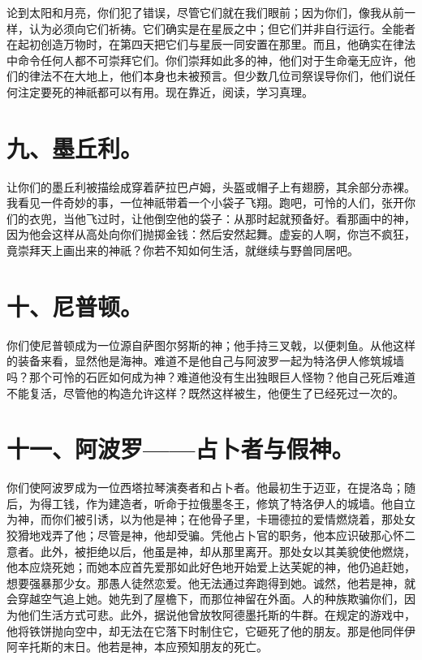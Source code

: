 论到太阳和月亮，你们犯了错误，尽管它们就在我们眼前；因为你们，像我从前一样，认为必须向它们祈祷。它们确实是在星辰之中；但它们并非自行运行。全能者在起初创造万物时，在第四天把它们与星辰一同安置在那里。而且，他确实在律法中命令任何人都不可崇拜它们。你们崇拜如此多的神，他们对于生命毫无应许，他们的律法不在大地上，他们本身也未被预言。但少数几位司祭误导你们，他们说任何注定要死的神祇都可以有用。现在靠近，阅读，学习真理。\par


\section{九、墨丘利。}

让你们的墨丘利被描绘成穿着萨拉巴卢姆，头盔或帽子上有翅膀，其余部分赤裸。我看见一件奇妙的事，一位神祇带着一个小袋子飞翔。跑吧，可怜的人们，张开你们的衣兜，当他飞过时，让他倒空他的袋子：从那时起就预备好。看那画中的神，因为他会这样从高处向你们抛掷金钱：然后安然起舞。虚妄的人啊，你岂不疯狂，竟崇拜天上画出来的神祇？你若不知如何生活，就继续与野兽同居吧。\par


\section{十、尼普顿。}

你们使尼普顿成为一位源自萨图尔努斯的神；他手持三叉戟，以便刺鱼。从他这样的装备来看，显然他是海神。难道不是他自己与阿波罗一起为特洛伊人修筑城墙吗？那个可怜的石匠如何成为神？难道他没有生出独眼巨人怪物？他自己死后难道不能复活，尽管他的构造允许这样？既然这样被生，他便生了已经死过一次的。\par


\section{十一、阿波罗——占卜者与假神。}

你们使阿波罗成为一位西塔拉琴演奏者和占卜者。他最初生于迈亚，在提洛岛；随后，为得工钱，作为建造者，听命于拉俄墨冬王，修筑了特洛伊人的城墙。他自立为神，而你们被引诱，以为他是神；在他骨子里，卡珊德拉的爱情燃烧着，那处女狡猾地戏弄了他；尽管是神，他却受骗。凭他占卜官的职务，他本应识破那心怀二意者。此外，被拒绝以后，他虽是神，却从那里离开。那处女以其美貌使他燃烧，他本应烧死她；而她本应首先爱那如此好色地开始爱上达芙妮的神，他仍追赶她，想要强暴那少女。那愚人徒然恋爱。他无法通过奔跑得到她。诚然，他若是神，就会穿越空气追上她。她先到了屋檐下，而那位神留在外面。人的种族欺骗你们，因为他们生活方式可悲。此外，据说他曾放牧阿德墨托斯的牛群。在规定的游戏中，他将铁饼抛向空中，却无法在它落下时制住它，它砸死了他的朋友。那是他同伴伊阿辛托斯的末日。他若是神，本应预知朋友的死亡。\par

